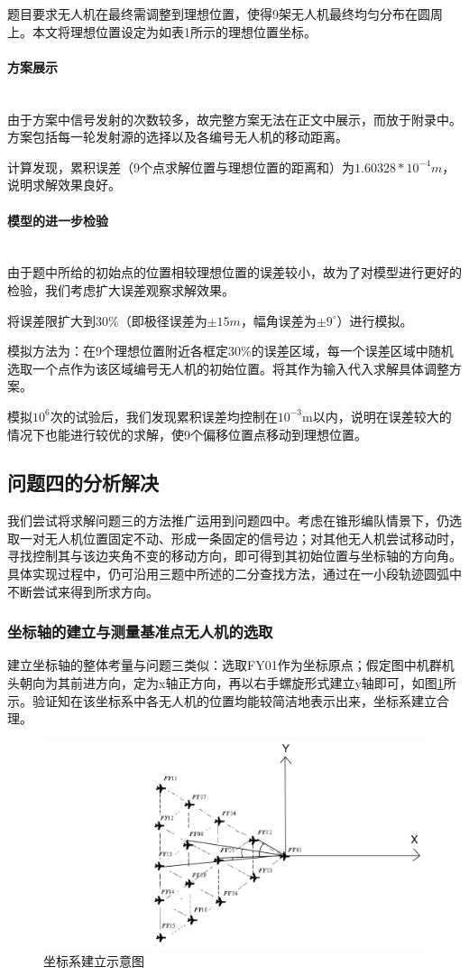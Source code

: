 \documentclass{ctexart}
\newcommand{\subsubsubsection}[1]{\paragraph{#1}\mbox{}\\}
\begin{document}
题目要求无人机在最终需调整到理想位置，使得9架无人机最终均匀分布在圆周上。本文将理想位置设定为如表1所示的理想位置坐标。
\subsubsubsection{方案展示}

由于方案中信号发射的次数较多，故完整方案无法在正文中展示，而放于附录中。方案包括每一轮发射源的选择以及各编号无人机的移动距离。

计算发现，累积误差（9个点求解位置与理想位置的距离和）为$1.60328*10^{-4}m$，说明求解效果良好。

\subsubsubsection{模型的进一步检验}

由于题中所给的初始点的位置相较理想位置的误差较小，故为了对模型进行更好的检验，我们考虑扩大误差观察求解效果。

将误差限扩大到30\%（即极径误差为$\pm 15m $，幅角误差为$\pm 9^{\circ}$）进行模拟。

模拟方法为：在9个理想位置附近各框定30\%的误差区域，每一个误差区域中随机选取一个点作为该区域编号无人机的初始位置。将其作为输入代入求解具体调整方案。

模拟$10^6$次的试验后，我们发现累积误差均控制在$10^{-3}$m以内，说明在误差较大的情况下也能进行较优的求解，使9个偏移位置点移动到理想位置。

\subsection{问题四的分析解决}
我们尝试将求解问题三的方法推广运用到问题四中。考虑在锥形编队情景下，仍选取一对无人机位置固定不动、形成一条固定的信号边；对其他无人机尝试移动时，寻找控制其与该边夹角不变的移动方向，即可得到其初始位置与坐标轴的方向角。具体实现过程中，仍可沿用三题中所述的二分查找方法，通过在一小段轨迹圆弧中不断尝试来得到所求方向。

\subsubsection{坐标轴的建立与测量基准点无人机的选取} 

建立坐标轴的整体考量与问题三类似：选取FY01作为坐标原点；假定图中机群机头朝向为其前进方向，定为x轴正方向，再以右手螺旋形式建立y轴即可，如图\ref{坐标系建立示意图}所示。验证知在该坐标系中各无人机的位置均能较简洁地表示出来，坐标系建立合理。

\begin{figure}[H]
  \centering
  \includegraphics[width=0.55\linewidth]{pic/share.jpg}
  \caption{坐标系建立示意图}
  \label{坐标系建立示意图}
  \end{figure}
\end{document}

